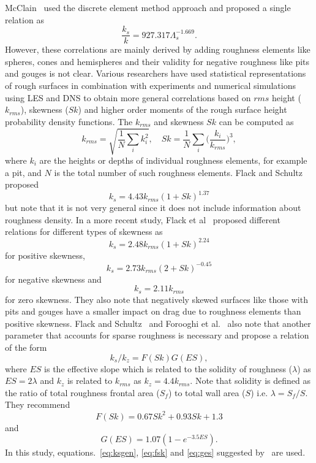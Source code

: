 McClain~\cite{McClain} used the discrete element method approach and proposed a single relation as 
\begin{equation}
\frac{k_s}{k} = 927.317\Lambda_s^{-1.669}.
\end{equation}
However, these correlations are mainly derived by adding roughness elements like spheres, cones and hemispheres and their validity for negative roughness like pits and gouges is not clear. Various researchers have used statistical representations of rough surfaces in combination with experiments and numerical simulations using  LES and DNS to obtain more general correlations based on $rms$ height ($k_{rms}$), skewness ($Sk$) and higher order moments of the rough surface height probability density functions. The $k_{rms}$ and skewness $Sk$ can be computed as 
\begin{equation}
k_{rms} = \sqrt{\frac{1}{N}\sum_i k_i^2}, \quad Sk = \frac{1}{N}\sum_i \Bigg(\frac{k_i}{k_{rms}}\Bigg)^3,
\end{equation}
where $k_i$ are the heights or depths of individual roughness elements, for example a pit, and $N$ is the total number of such roughness elements. Flack and Schultz~\cite{flack2014roughness} proposed 
\begin{equation}
k_{s} = 4.43 k_{rms}(1+Sk)^{1.37}
\end{equation}
but note that it is not very general since it does not include information about roughness density. In a more recent study, Flack et al~\cite{flack2020skin} proposed different relations for different types of skewness as
\begin{equation}
k_{s} = 2.48 k_{rms}(1+Sk)^{2.24}
\end{equation}
for positive skewness, 
\begin{equation}
k_{s} = 2.73 k_{rms}(2+Sk)^{-0.45}
\end{equation}
for negative skewness and
\begin{equation}
k_{s} = 2.11 k_{rms}
\end{equation}
for zero skewness. They also note that negatively skewed surfaces like those with pits and gouges have a smaller impact on drag due to roughness elements than positive skewness. Flack and Schultz~\cite{flack2010review} and Forooghi et al.~\cite{forooghi2017} also note that another parameter that accounts for sparse roughness is necessary and propose a relation of the form
\begin{equation}
k_s/k_z = F(Sk)G(ES),
\label{eq:ksgen}
\end{equation}
where $ES$ is the effective slope which is related to the solidity of roughness ($\lambda$) as $ES=2\lambda$ and $k_z$ is related to $k_{rms}$ as $k_z=4.4k_{rms}$. Note that solidity is defined as the ratio of total roughness frontal area ($S_f$) to total wall area ($S$) i.e. $\lambda=S_f/S$. They recommend
\begin{equation}
F(Sk) = 0.67Sk^2+0.93Sk+1.3
\label{eq:fsk}
\end{equation}
and
\begin{equation}
G(ES)=1.07(1-e^{-3.5ES}).
\label{eq:ges}
\end{equation}
 In this study, equations.~\ref{eq:ksgen}, \ref{eq:fsk} and \ref{eq:ges} suggested by~\cite{forooghi2017} are used. 
